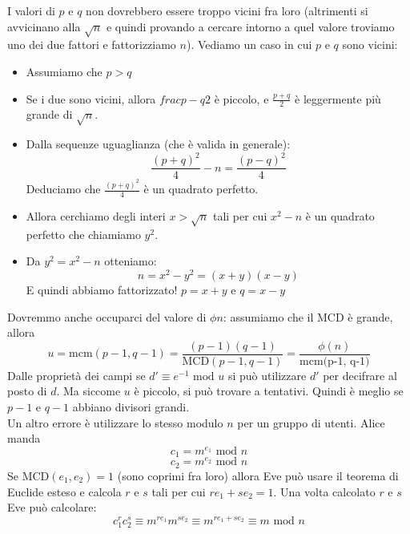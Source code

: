 I valori di $p$ e $q$ non dovrebbero essere troppo vicini fra loro (altrimenti si avvicinano alla $\sqrt{n}$ e quindi provando a cercare intorno a quel valore troviamo uno dei due fattori e fattorizziamo $n$).
Vediamo un caso in cui $p$ e $q$ sono vicini:
\begin{itemize}
	\item Assumiamo che $p>q$
	\item Se i due sono vicini, allora $frac{p-q}{2}$ è piccolo, e $\frac{p+q}{2}$ è leggermente più grande di $\sqrt{n}$.
	\item Dalla sequenze uguaglianza (che è valida in generale):
	\begin{equation*}
		\frac{(p+q)^2}{4} - n = \frac{(p-q)^2}{4}
	\end{equation*}
	Deduciamo che $\frac{(p+q)^2}{4}$ è un quadrato perfetto.
	\item Allora cerchiamo degli interi $x > \sqrt{n}$ tali per cui $x^2-n$ è un quadrato perfetto che chiamiamo $y^2$.
	\item Da $y^2 = x^2 -n$ otteniamo:
	\begin{equation*}
		n = x^2-y^2 =(x+y)(x-y)
	\end{equation*}
	E quindi abbiamo fattorizzato! $p=x+y$ e $q=x-y$
\end{itemize}


Dovremmo anche occuparci del valore di $\phi{n}$: assumiamo che il MCD è grande, allora
\begin{equation*}
	u = \text{mcm}(p-1,q-1) = \frac{(p-1)(q-1)}{\text{MCD}(p-1,q-1)} = \frac{\phi(n)}{\text{mcm(p-1, q-1)}}
\end{equation*}
Dalle proprietà dei campi se $d' \equiv e^{-1} \text{ mod } u $ si può utilizzare $d'$ per decifrare al posto di $d$. Ma siccome $u$ è piccolo, si può trovare a tentativi. Quindi è meglio se $p-1$ e $q-1$ abbiano divisori grandi.\\

Un altro errore è utilizzare lo stesso modulo $n$ per un gruppo di utenti.
Alice manda
\begin{equation*}
	c_1 = m^{e_1} \text { mod } n
\end{equation*}
\begin{equation*}
	c_2 = m^{e_2} \text { mod } n
\end{equation*}
Se MCD$(e_1, e_2) = 1$ (sono coprimi fra loro) allora Eve può usare il teorema di Euclide esteso e calcola $r$ e $s$ tali per cui $re_1 + se_2 = 1$.
Una volta calcolato $r$ e $s$ Eve può calcolare:
\begin{equation*}
	c_1^rc_2^s \equiv m^{re_1}m^{se_2} \equiv m^{re_1 + se_2} \equiv m \text { mod } n
\end{equation*}

